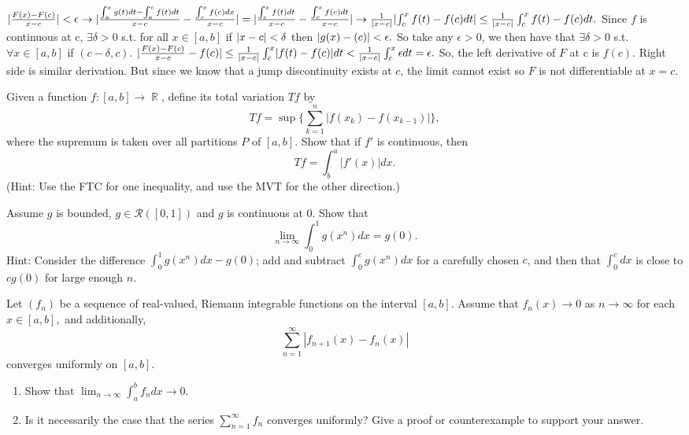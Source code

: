 \documentclass[12pt,letterpaper,boxed]{hmcpset}
\DeclareMathOperator{\R}{\mathbb{R}}
\DeclarePairedDelimiter\abs{\lvert}{\rvert}%
\begin{document}
\begin{solution}
$|\frac{F(x) - F(c)}{x - c}| < \epsilon \rightarrow |\frac{\int_{a}^{x}g(t)dt - \int_{a}^{c}f(t)dt}{x - c} - \frac{\int_{c}^{x}f(c)dx}{x-c}|=|\frac{\int_{c}^{x}f(t)dt}{x-c} - \frac{\int_{c}^{x}f(c)dt}{x-c}| \rightarrow \frac{1}{\abs{x-c}}\abs{\int_{c}^{x}f(t) - f(c)dt}\leq \frac{1}{\abs{x-c}}\int_{c}^{x}f(t) - f(c)dt.$ Since $f$ is continuous at c, $\exists\delta>0$ s.t. for all $x\in[a,b]$ if $\abs{x-c} < \delta$ then $\abs{g(x)-(c)}<\epsilon.$ So take any $\epsilon>0$, we then have that $\exists\delta>0$ s.t. $\forall x\in[a,b]$ if $(c - \delta,c)$. $\abs{\frac{F(x) - F(c)}{x - c} - f(c)} \leq \frac{1}{\abs{x-c}}\int_{c}^{x}\abs{f(t) - f(c)}dt < \frac{1}{\abs{x - c}}\int_{c}^{x}\epsilon dt=\epsilon.$ So, the left derivative of $F$ at c is $f(c)$. Right side is similar derivation. But since we know that a jump discontinuity exists at $c$, the limit cannot exist so $F$ is not differentiable at $x=c.$
\end{solution}

\begin{problem}[Exercise 2.19]
Given a function $f : [a,b]\rightarrow \R$, define its total variation $T f$ by $$T f = \sup\{\sum_{k=1}^{n} |f(x_k) - f(x_{k-1})|\},$$ where the supremum is taken over all partitions $P$ of $[a,b]$. Show that if $f'$ is continuous, then $$T f = \int_{b}^{a}|f'(x)|dx.$$ (Hint: Use the FTC for one inequality, and use the MVT for the other direction.)
\end{problem}

\begin{solution}

\end{solution}

\begin{problem}[Exercise 2.20]
Assume $g$ is bounded, $g \in \mathcal{R}([0,1])$ and $g$ is continuous at 0. Show that $$\lim_{n\rightarrow \infty}\int_{0}^{1}g(x^{n})dx = g(0).$$ Hint: Consider the difference $\int_{0}^{1}g(x^{n})dx - g(0)$; add and subtract $\int_{0}^{c} g(x^{n})dx$ for a carefully chosen $c$, and then that $\int_{0}^{c}dx$ is close to $cg(0)$ for large enough $n.$
\end{problem}

\begin{solution}

\end{solution}

\begin{problem}[Exercise 3.3]
Let $(f_n)$ be a sequence of real-valued, Riemann integrable functions on the interval $[a,b]$. Assume that $f_{n}(x)\rightarrow 0$ as $n\rightarrow\infty$ for each $x\in[a,b],$ and additionally, $$\sum_{n=1}^{\infty}|f_{n + 1}(x) - f_{n}(x)|$$ converges uniformly on $[a,b]$.
\begin{enumerate}
    \item Show that $\lim_{n \rightarrow\infty}\int_{a}^{b}f_n dx \rightarrow 0.$
    \item Is it necessarily the case that the series $\sum_{n=1}^{\infty}f_n$ converges uniformly? Give a proof or counterexample to support your answer.
\end{enumerate}
\end{problem}

\begin{solution}
\end{solution}
\end{document}
